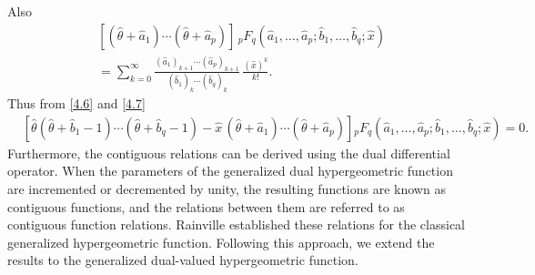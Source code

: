 \documentclass[11pt,a4paper,fleqn]{article}
\numberwithin{equation}{section}
\numberwithin{lemma}{section}
\numberwithin{theorem}{section}
\numberwithin{corollary}{section}
\begin{document}
Also
\begin{align}
	& [ (\widehat{\theta} + \widehat{a}_1) \cdots (\widehat{\theta} + \widehat{a}_p)] \, {}_pF_q (\widehat{a}_1, \dots, \widehat{a}_p; \widehat{b}_1, \dots, \widehat{b}_q;  \widehat{x})\nonumber\\
	& = \sum_{k = 0}^{\infty} \frac{(\widehat{a}_1)_{k + 1} \cdots (\widehat{a}_p)_{k + 1}}{(\widehat{b}_1)_k \cdots (\widehat{b}_q)_k} \, \frac{ (\widehat{x})^k}{k!}. \label{4.7}
\end{align}
Thus from \eqref{4.6} and \eqref{4.7}
\begin{align}
	& [ \widehat{\theta} (\widehat{\theta} + \widehat{b}_1 - 1) \cdots (\widehat{\theta} + \widehat{b}_q - 1) - \widehat{x} \, (\widehat{\theta} + \widehat{a}_1) \cdots (\widehat{\theta} + \widehat{a}_p)] {}_pF_q (\widehat{a}_1, \dots, \widehat{a}_p; \widehat{b}_1, \dots, \widehat{b}_q;  \widehat{x}) = 0.
\end{align}
Furthermore, the contiguous relations can be derived using the dual differential operator. When the parameters of the generalized dual hypergeometric function are incremented or decremented by unity, the resulting functions are known as contiguous functions, and the relations between them are referred to as contiguous function relations. Rainville \cite{edr45} established these relations for the classical generalized hypergeometric function. Following this approach, we extend the results to the generalized dual-valued hypergeometric function. %
\end{document}
